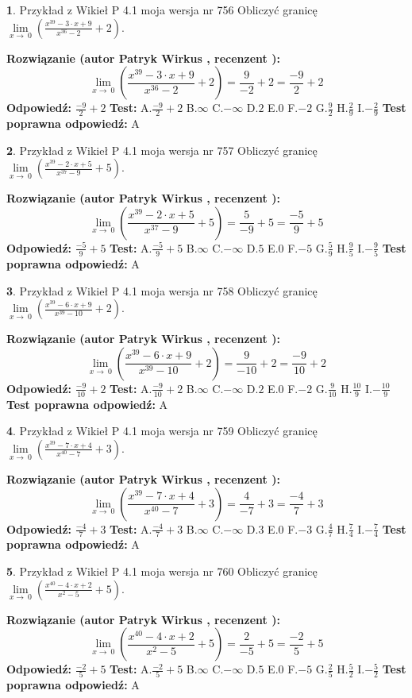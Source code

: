 \documentclass[12pt, a4paper]{article}
\theoremstyle{definition} %
\newtheorem{zad}{}
\newcommand{\zadStart}[1]{\begin{zad}#1\newline}
\newcommand{\zadStop}{\end{zad}}
\newcommand{\rozwStart}[2]{\noindent \textbf{Rozwiązanie (autor #1 , recenzent #2): }\newline}
\newcommand{\rozwStop}{\newline}
\newcommand{\odpStart}{\noindent \textbf{Odpowiedź:}\newline}
\newcommand{\odpStop}{\newline}
\newcommand{\testStart}{\noindent \textbf{Test:}\newline}
\newcommand{\testStop}{\newline}
\newcommand{\kluczStart}{\noindent \textbf{Test poprawna odpowiedź:}\newline}
\newcommand{\kluczStop}{\newline}
\begin{document}
\zadStart{Przykład z Wikieł P 4.1 moja wersja nr 756}
Obliczyć granicę $\lim\limits_{x\to\ 0}(\frac{x^{39}-3 \cdot x +9}{x^{36}-2}+2)$.
\zadStop
\rozwStart{Patryk Wirkus}{}
$$\lim\limits_{x\to\ 0}(\frac{x^{39}-3 \cdot x +9}{x^{36}-2}+2)=\frac{9}{-2}+2=\frac{-9}{2}+2$$
\rozwStop
\odpStart
$\frac{-9}{2}+2$
\odpStop
\testStart
A.$\frac{-9}{2}+2$
B.$\infty$
C.$-\infty$
D.$2$
E.$0$
F.$-2$
G.$\frac{9}{2}$
H.$\frac{2}{9}$
I.$-\frac{2}{9}$
\testStop
\kluczStart
A
\kluczStop



\zadStart{Przykład z Wikieł P 4.1 moja wersja nr 757}
Obliczyć granicę $\lim\limits_{x\to\ 0}(\frac{x^{39}-2 \cdot x +5}{x^{37}-9}+5)$.
\zadStop
\rozwStart{Patryk Wirkus}{}
$$\lim\limits_{x\to\ 0}(\frac{x^{39}-2 \cdot x +5}{x^{37}-9}+5)=\frac{5}{-9}+5=\frac{-5}{9}+5$$
\rozwStop
\odpStart
$\frac{-5}{9}+5$
\odpStop
\testStart
A.$\frac{-5}{9}+5$
B.$\infty$
C.$-\infty$
D.$5$
E.$0$
F.$-5$
G.$\frac{5}{9}$
H.$\frac{9}{5}$
I.$-\frac{9}{5}$
\testStop
\kluczStart
A
\kluczStop



\zadStart{Przykład z Wikieł P 4.1 moja wersja nr 758}
Obliczyć granicę $\lim\limits_{x\to\ 0}(\frac{x^{39}-6 \cdot x +9}{x^{39}-10}+2)$.
\zadStop
\rozwStart{Patryk Wirkus}{}
$$\lim\limits_{x\to\ 0}(\frac{x^{39}-6 \cdot x +9}{x^{39}-10}+2)=\frac{9}{-10}+2=\frac{-9}{10}+2$$
\rozwStop
\odpStart
$\frac{-9}{10}+2$
\odpStop
\testStart
A.$\frac{-9}{10}+2$
B.$\infty$
C.$-\infty$
D.$2$
E.$0$
F.$-2$
G.$\frac{9}{10}$
H.$\frac{10}{9}$
I.$-\frac{10}{9}$
\testStop
\kluczStart
A
\kluczStop



\zadStart{Przykład z Wikieł P 4.1 moja wersja nr 759}
Obliczyć granicę $\lim\limits_{x\to\ 0}(\frac{x^{39}-7 \cdot x +4}{x^{40}-7}+3)$.
\zadStop
\rozwStart{Patryk Wirkus}{}
$$\lim\limits_{x\to\ 0}(\frac{x^{39}-7 \cdot x +4}{x^{40}-7}+3)=\frac{4}{-7}+3=\frac{-4}{7}+3$$
\rozwStop
\odpStart
$\frac{-4}{7}+3$
\odpStop
\testStart
A.$\frac{-4}{7}+3$
B.$\infty$
C.$-\infty$
D.$3$
E.$0$
F.$-3$
G.$\frac{4}{7}$
H.$\frac{7}{4}$
I.$-\frac{7}{4}$
\testStop
\kluczStart
A
\kluczStop



\zadStart{Przykład z Wikieł P 4.1 moja wersja nr 760}
Obliczyć granicę $\lim\limits_{x\to\ 0}(\frac{x^{40}-4 \cdot x +2}{x^{2}-5}+5)$.
\zadStop
\rozwStart{Patryk Wirkus}{}
$$\lim\limits_{x\to\ 0}(\frac{x^{40}-4 \cdot x +2}{x^{2}-5}+5)=\frac{2}{-5}+5=\frac{-2}{5}+5$$
\rozwStop
\odpStart
$\frac{-2}{5}+5$
\odpStop
\testStart
A.$\frac{-2}{5}+5$
B.$\infty$
C.$-\infty$
D.$5$
E.$0$
F.$-5$
G.$\frac{2}{5}$
H.$\frac{5}{2}$
I.$-\frac{5}{2}$
\testStop
\kluczStart
A
\kluczStop
\end{document}
